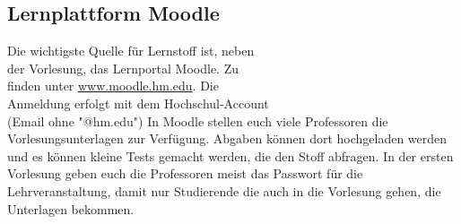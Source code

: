 \subsection{Lernplattform Moodle}
Die wichtigste Quelle für Lernstoff ist, neben \\
der Vorlesung, das Lernportal Moodle. Zu \\
finden unter \url{www.moodle.hm.edu}. Die\\
Anmeldung erfolgt mit dem Hochschul-Account \\
(Email ohne "@hm.edu")\doublebreak
In Moodle stellen euch viele Professoren die Vorlesungsunterlagen zur Verfügung. Abgaben können dort hochgeladen werden und es können kleine Tests gemacht werden, die den Stoff abfragen. In der 
ersten Vorlesung geben euch die Professoren meist das Passwort für die Lehrveranstaltung, damit nur Studierende die auch in die Vorlesung gehen, die Unterlagen bekommen. 